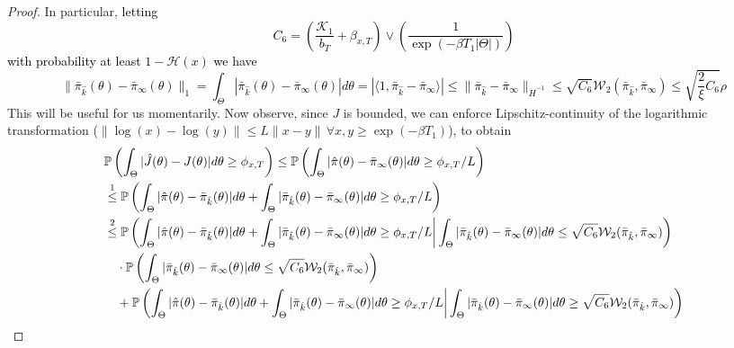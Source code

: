 \documentclass[journal,onecolumn]{IEEEtran}
\newcommand{\rew}{J}
\newcommand{\PR}{\mathbb{P}}
\newcommand{\wass}{\mathcal{W}_2}
\newcommand{\mk}{\mathcal{K}}
\newcommand{\wassprox}{\rho}
\newcommand{\kfv}{x} %
\newcommand{\zconst}{\xi}
\newcommand{\snum}{T}
\newcommand{\hk}{\hat{k}}
\newcommand{\csix}{C_6}
\begin{document}
{{\begin{proof}
In particular, \textcolor{black}{letting 
\begin{equation}
\label{eq:cdef}
    \csix = \left(\frac{\mk_1}{b_T} + \beta_{x,T}\right) \vee \left( \frac{1}{\exp(-\beta T_1 |\Theta|)}\right)
\end{equation} with probability at least $1-\mathcal{H}(x)$ we have 
\begin{equation}
\label{eq:l1recbd}
    \|\bar{\pi}_{\hk}(\theta) - \bar{\pi}_{\infty}(\theta)\|_{1} = \int_{\Theta}| \bar{\pi}_{\hk}(\theta) - \bar{\pi}_{\infty}(\theta)| d\theta  = |\langle 1, \bar{\pi}_{\hk} - \bar{\pi}_{\infty}\rangle | \leq \|\bar{\pi}_{\hk} - \bar{\pi}_{\infty}\|_{\dot{H}^{-1}} \leq \sqrt{\csix}\wass(\bar{\pi}_{\hk},\bar{\pi}_{\infty}) \leq \sqrt{\frac{2}{\zconst}\csix} \wassprox
\end{equation}}
This will be useful for us momentarily. Now observe, since $\rew$ is bounded, we can enforce Lipschitz-continuity of the logarithmic transformation ($\|\log(x) - \log(y)\| \leq L\|x-y\| \, \forall x,y \geq \exp(-\beta T_1)$), to obtain
\textcolor{black}{\begin{align*}
    &\PR\left(\int_{\Theta}|\hat{J}(\theta) - J(\theta)|d\theta \geq  \phi_{\kfv,\textcolor{black}{\snum}}\right) \leq \PR\left(\int_{\Theta}|\hat{\pi}(\theta) - \bar{\pi}_{\infty}(\theta)|d\theta \geq  \phi_{\kfv,\textcolor{black}{\snum}}/L\right) \\
    &\overset{1}{\leq} \PR\left(\int_{\Theta}|\hat{\pi}(\theta) - \bar{\pi}_{\hk}(\theta)|d\theta + \int_{\Theta}|\bar{\pi}_{\hk}(\theta) - \bar{\pi}_{\infty}(\theta)| d\theta \geq  \phi_{\kfv,\textcolor{black}{\snum}}/L \right) \\
    & \overset{2}{\leq} \PR\left(\int_{\Theta}|\hat{\pi}(\theta) - \bar{\pi}_{\hk}(\theta)|d\theta + \int_{\Theta}|\bar{\pi}_{\hk}(\theta) - \bar{\pi}_{\infty}(\theta)| d\theta \geq  \phi_{\kfv,\snum}/L \bigg| \int_{\Theta}|\bar{\pi}_{\hk}(\theta) - \bar{\pi}_{\infty}(\theta)| d\theta \leq \sqrt{\csix}\wass(\bar{\pi}_{\hk}, \bar{\pi}_{\infty})\right)\\
    &\quad \cdot \PR\left(\int_{\Theta}|\bar{\pi}_{\hk}(\theta) - \bar{\pi}_{\infty}(\theta)| d\theta \leq \sqrt{\csix}\wass(\bar{\pi}_{\hk},\bar{\pi}_{\infty})\right)\\
    & \quad + \PR\left(\int_{\Theta}|\hat{\pi}(\theta) - \bar{\pi}_{\hk}(\theta)|d\theta + \int_{\Theta}|\bar{\pi}_{\hk}(\theta) - \bar{\pi}_{\infty}(\theta)| d\theta \geq  \phi_{\kfv,\snum}/L \bigg| \int_{\Theta}|\bar{\pi}_{\hk}(\theta) - \bar{\pi}_{\infty}(\theta)| d\theta \geq \sqrt{\csix}\wass(\bar{\pi}_{\hk}, \bar{\pi}_{\infty})\right)\\

\end{align*}}
\end{proof}}}
\end{document}
